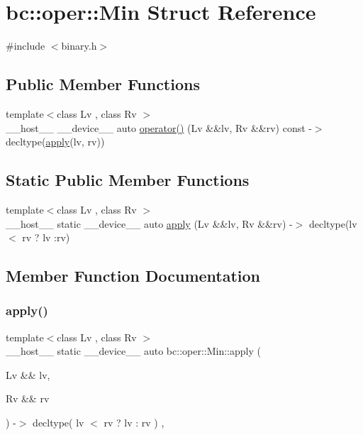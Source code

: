 \hypertarget{structbc_1_1oper_1_1Min}{}\section{bc\+:\+:oper\+:\+:Min Struct Reference}
\label{structbc_1_1oper_1_1Min}


{\ttfamily \#include $<$binary.\+h$>$}

\subsection*{Public Member Functions}
\begin{DoxyCompactItemize}
\item 
{\footnotesize template$<$class Lv , class Rv $>$ }\\\+\_\+\+\_\+host\+\_\+\+\_\+ \+\_\+\+\_\+device\+\_\+\+\_\+ auto \hyperlink{structbc_1_1oper_1_1Min_a1cb6ace7faa8b791d3ee2ae40c61dd7b}{operator()} (Lv \&\&lv, Rv \&\&rv) const -\/$>$ decltype(\hyperlink{structbc_1_1oper_1_1Min_abf39f4a93eff4b1a318265f4e9661b02}{apply}(lv, rv))
\end{DoxyCompactItemize}
\subsection*{Static Public Member Functions}
\begin{DoxyCompactItemize}
\item 
{\footnotesize template$<$class Lv , class Rv $>$ }\\\+\_\+\+\_\+host\+\_\+\+\_\+ static \+\_\+\+\_\+device\+\_\+\+\_\+ auto \hyperlink{structbc_1_1oper_1_1Min_abf39f4a93eff4b1a318265f4e9661b02}{apply} (Lv \&\&lv, Rv \&\&rv) -\/$>$ decltype(lv$<$ rv ? lv \+:rv)
\end{DoxyCompactItemize}


\subsection{Member Function Documentation}
\mbox{\label{structbc_1_1oper_1_1Min_abf39f4a93eff4b1a318265f4e9661b02}} 
\subsubsection{\texorpdfstring{apply()}{apply()}}
{\footnotesize\ttfamily template$<$class Lv , class Rv $>$ \\
\+\_\+\+\_\+host\+\_\+\+\_\+ static \+\_\+\+\_\+device\+\_\+\+\_\+ auto bc\+::oper\+::\+Min\+::apply (\begin{DoxyParamCaption}\item[{Lv \&\&}]{lv,  }\item[{Rv \&\&}]{rv }\end{DoxyParamCaption}) -\/$>$ decltype( lv $<$ rv ? lv \+: rv ) \hspace{0.3cm}{\ttfamily [inline]}, {\ttfamily [static]}}


